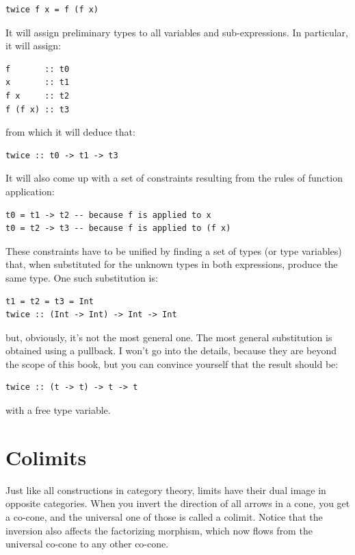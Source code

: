 \begin{Verbatim}[commandchars=\\\{\}]
twice f x = f (f x)
\end{Verbatim}
It will assign preliminary types to all variables and sub-expressions.
In particular, it will assign:

\begin{Verbatim}[commandchars=\\\{\}]
f       :: t0
x       :: t1
f x     :: t2
f (f x) :: t3
\end{Verbatim}
from which it will deduce that:

\begin{Verbatim}[commandchars=\\\{\}]
twice :: t0 -> t1 -> t3
\end{Verbatim}
It will also come up with a set of constraints resulting from the rules
of function application:

\begin{Verbatim}[commandchars=\\\{\}]
t0 = t1 -> t2 -- because f is applied to x 
t0 = t2 -> t3 -- because f is applied to (f x)
\end{Verbatim}
These constraints have to be unified by finding a set of types (or type
variables) that, when substituted for the unknown types in both
expressions, produce the same type. One such substitution is:

\begin{Verbatim}[commandchars=\\\{\}]
t1 = t2 = t3 = Int 
twice :: (Int -> Int) -> Int -> Int
\end{Verbatim}
but, obviously, it's not the most general one. The most general
substitution is obtained using a pullback. I won't go into the details,
because they are beyond the scope of this book, but you can convince
yourself that the result should be:

\begin{Verbatim}[commandchars=\\\{\}]
twice :: (t -> t) -> t -> t
\end{Verbatim}
with  a free type variable.

\section{Colimits}\label{colimits}

Just like all constructions in category theory, limits have their dual
image in opposite categories. When you invert the direction of all
arrows in a cone, you get a co-cone, and the universal one of those is
called a colimit. Notice that the inversion also affects the factorizing
morphism, which now flows from the universal co-cone to any other
co-cone.

